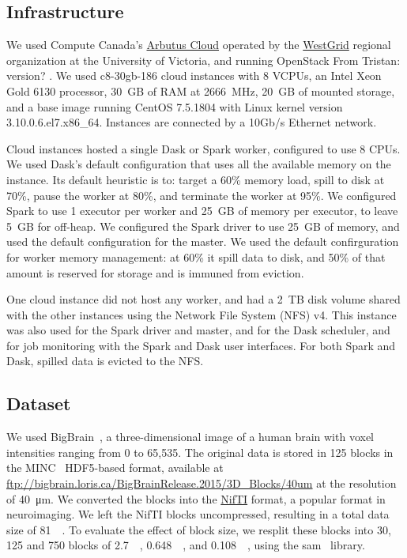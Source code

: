 \documentclass[conference]{IEEEtran}
\newcommand{\TG}[1]{\color{cyan}From Tristan: #1 \color{black}}
\begin{document}
\subsection{Infrastructure}

 We used Compute Canada's
 \href{https://docs.computecanada.ca/wiki/Cloud_resources}{Arbutus Cloud}
 operated by the \href{https://www.westgrid.ca}{WestGrid} regional
 organization at the University of Victoria, and running OpenStack
 \TG{version?}. We used c8-30gb-186 cloud instances with 8 VCPUs, an Intel
 Xeon Gold 6130 processor, 30~GB of RAM at 2666~MHz, 20~GB of mounted
 storage, and a base image running CentOS 7.5.1804 with  Linux kernel
 version
 3.10.0.6.el7.x86\_64. Instances are connected by a 10Gb/s Ethernet network. 
 
 Cloud instances hosted a single Dask or Spark worker, configured to use 8 CPUs. We
 used Dask's default configuration that uses all the available memory on the
 instance. Its default heuristic is to: target a 60\% memory load, spill to disk at
 70\%, pause the worker at 80\%, and terminate the worker at 95\%. We configured
 Spark to use 1 executor per worker and 25~GB of memory per executor, to leave 5~GB
 for off-heap. We configured the Spark driver to use 25~GB of memory, and used the
 default configuration for the master. We used the default confirguration for worker
 memory management: at 60\% it spill data to disk, and 50\% of that amount is
 reserved for storage and is immuned from eviction.
 
 One cloud instance did not host any worker, and had a 2~TB disk volume
 shared with the other instances using the Network File System (NFS) v4.
 This instance was also used for the Spark driver and master, and for the
 Dask scheduler, and for job monitoring with the Spark and Dask user
 interfaces. For both Spark and Dask, spilled data is evicted to the NFS.

\subsection{Dataset}

We used BigBrain~\cite{Amunts:13}, a three-dimensional image of a human
brain with voxel intensities ranging from 0 to 65,535. The original data is
stored in 125 blocks in the MINC~\cite{minc} HDF5-based format, available
at \url{ftp://bigbrain.loris.ca/BigBrainRelease.2015/3D_Blocks/40um} at the
resolution of \SI{40}{\micro\metre}. We converted the blocks into the
\href{https://nifti.nimh.nih.gov/nifti-1}{NifTI} format, a popular format
in neuroimaging. We left the NifTI blocks uncompressed, resulting in 
a total data size of \SI{81}{\giga\byte}. 
To evaluate the effect of block size, we resplit these blocks into 30, 125 and 750 blocks of 
\SI{2.7}{\giga\byte}, \SI{0.648}{\giga\byte}, and
\SI{0.108}{\giga\byte}, using the sam~\cite{sam} library.
\end{document}
